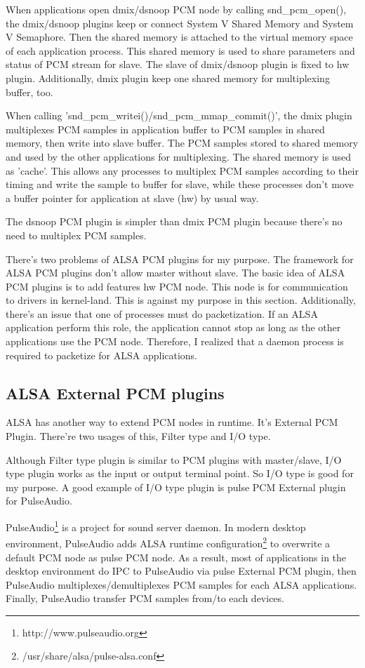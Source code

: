 \documentclass[onecolumn]{article}
\begin{document}
When applications open dmix/dsnoop PCM node by calling snd\_pcm\_open(), the dmix/dsnoop plugins keep or connect System V Shared Memory and System V Semaphore. Then the shared memory is attached to the virtual memory space of each application process. This shared memory is used to share parameters and status of PCM stream for slave. The slave of dmix/dsnoop plugin is fixed to hw plugin. Additionally, dmix plugin keep one shared memory for multiplexing buffer, too.

When calling 'snd\_pcm\_writei()/snd\_pcm\_mmap\_commit()', the dmix plugin multiplexes PCM samples in application buffer to PCM samples in shared memory, then write into slave buffer. The PCM samples stored to shared memory and used by the other applications for multiplexing. The shared memory is used as 'cache'. This allows any processes to multiplex PCM samples according to their timing and write the sample to buffer for slave, while these processes don't move a buffer pointer for application at slave (hw) by usual way.

The dsnoop PCM plugin is simpler than dmix PCM plugin because there's no need to multiplex PCM samples.

There's two problems of ALSA PCM plugins for my purpose. The framework for ALSA PCM plugins don't allow master without slave. The basic idea of ALSA PCM plugins is to add features hw PCM node. This node is for communication to drivers in kernel-land. This is against my purpose in this section. Additionally, there's an issue that one of processes must do packetization. If an ALSA application perform this role, the application cannot stop as long as the other applications use the PCM node. Therefore, I realized that a daemon process is required to packetize for ALSA applications.


\subsection{ALSA External PCM plugins}
ALSA has another way to extend PCM nodes in runtime. It's External PCM Plugin. There're two usages of this, Filter type and I/O type.

Although Filter type plugin is similar to PCM plugins with master/slave, I/O type plugin works as the input or output terminal point. So I/O type is good for my purpose. A good example of I/O type plugin is pulse PCM External plugin for PulseAudio.

PulseAudio\footnote{http://www.pulseaudio.org} is a project for sound server daemon. In modern desktop environment, PulseAudio adds ALSA runtime configuration\footnote{/usr/share/alsa/pulse-alsa.conf} to overwrite a default PCM node as pulse PCM node. As a result, most of applications in the desktop environment do IPC to PulseAudio via pulse External PCM plugin, then PulseAudio multiplexes/demultiplexes PCM samples for each ALSA applications. Finally, PulseAudio transfer PCM samples from/to each devices.
\end{document}
